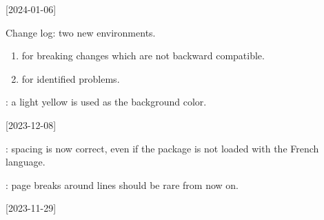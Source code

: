 

[2024-01-06]

\small

\begin{tdocnew}
    \item Change log: two new environments.
    \begin{enumerate}
        \item {} for breaking changes which are not backward compatible.

        \item {} for identified problems.
    \end{enumerate}

    \item {}: a light yellow is used as the background color.
\end{tdocnew}

\tdocsep




[2023-12-08]

\small

\begin{tdocfix}
    \item {}: spacing is now correct, even if the  package is not loaded with the French language.

    \item {} : page breaks around  lines should be rare from now on.
\end{tdocfix}

\tdocsep




[2023-11-29]

\small




